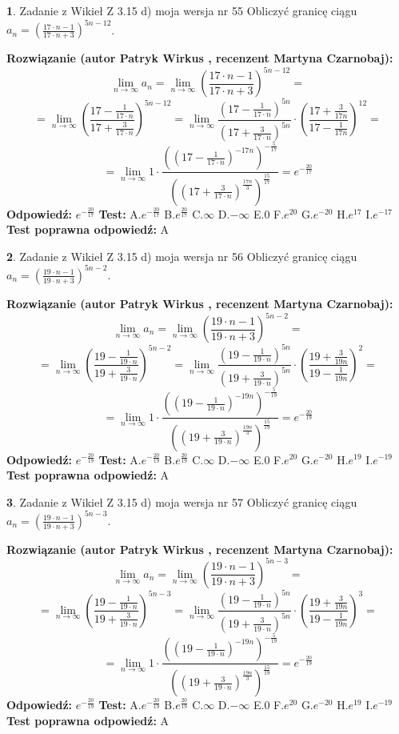 \documentclass[12pt, a4paper]{article}
\theoremstyle{definition} %
\newtheorem{zad}{}
\newcommand{\zadStart}[1]{\begin{zad}#1\newline}
\newcommand{\zadStop}{\end{zad}}
\newcommand{\rozwStart}[2]{\noindent \textbf{Rozwiązanie (autor #1 , recenzent #2): }\newline}
\newcommand{\rozwStop}{\newline}
\newcommand{\odpStart}{\noindent \textbf{Odpowiedź:}\newline}
\newcommand{\odpStop}{\newline}
\newcommand{\testStart}{\noindent \textbf{Test:}\newline}
\newcommand{\testStop}{\newline}
\newcommand{\kluczStart}{\noindent \textbf{Test poprawna odpowiedź:}\newline}
\newcommand{\kluczStop}{\newline}
\begin{document}
\zadStart{Zadanie z Wikieł Z 3.15 d) moja wersja nr 55}
Obliczyć granicę ciągu $a_{n}=(\frac{17\cdot n - 1}{17 \cdot n + 3})^{5n-12}$.
\zadStop
\rozwStart{Patryk Wirkus}{Martyna Czarnobaj}
$$\lim\limits_{n\to\infty} a_{n} = \lim\limits_{n\to\infty}(\frac{17\cdot n - 1}{17 \cdot n + 3})^{5n-12}=$$
$$=\lim\limits_{n\to\infty}(\frac{17 - \frac{1}{17\cdot n}}{17 + \frac{3}{17 \cdot n}})^{5n-12}=\lim\limits_{n\to\infty}\frac{(17 - \frac{1}{17\cdot n})^{5n}}{(17 + \frac{3}{17\cdot n})^{5n}} \cdot (\frac{17+\frac{3}{17n}}{17-\frac{1}{17n}})^{12}=$$
$$=\lim\limits_{n\to\infty} 1 \cdot \frac{((17-\frac{1}{17 \cdot n})^{-17n})^{-\frac{5}{17}}}{((17+\frac{3}{17 \cdot n})^{\frac{17n}{3}})^{\frac{15}{17}}} =e^{-\frac{20}{17}}$$
\rozwStop
\odpStart
$e^{-\frac{20}{17}}$
\odpStop
\testStart
A.$ e^{-\frac{20}{17}}$
B.$ e^{\frac{20}{17}}$
C.$\infty$
D.$-\infty$
E.$0$
F.$e^{20}$
G.$e^{-20}$
H.$e^{17}$
I.$e^{-17}$
\testStop
\kluczStart
A
\kluczStop



\zadStart{Zadanie z Wikieł Z 3.15 d) moja wersja nr 56}
Obliczyć granicę ciągu $a_{n}=(\frac{19\cdot n - 1}{19 \cdot n + 3})^{5n-2}$.
\zadStop
\rozwStart{Patryk Wirkus}{Martyna Czarnobaj}
$$\lim\limits_{n\to\infty} a_{n} = \lim\limits_{n\to\infty}(\frac{19\cdot n - 1}{19 \cdot n + 3})^{5n-2}=$$
$$=\lim\limits_{n\to\infty}(\frac{19 - \frac{1}{19\cdot n}}{19 + \frac{3}{19 \cdot n}})^{5n-2}=\lim\limits_{n\to\infty}\frac{(19 - \frac{1}{19\cdot n})^{5n}}{(19 + \frac{3}{19\cdot n})^{5n}} \cdot (\frac{19+\frac{3}{19n}}{19-\frac{1}{19n}})^{2}=$$
$$=\lim\limits_{n\to\infty} 1 \cdot \frac{((19-\frac{1}{19 \cdot n})^{-19n})^{-\frac{5}{19}}}{((19+\frac{3}{19 \cdot n})^{\frac{19n}{3}})^{\frac{15}{19}}} =e^{-\frac{20}{19}}$$
\rozwStop
\odpStart
$e^{-\frac{20}{19}}$
\odpStop
\testStart
A.$ e^{-\frac{20}{19}}$
B.$ e^{\frac{20}{19}}$
C.$\infty$
D.$-\infty$
E.$0$
F.$e^{20}$
G.$e^{-20}$
H.$e^{19}$
I.$e^{-19}$
\testStop
\kluczStart
A
\kluczStop



\zadStart{Zadanie z Wikieł Z 3.15 d) moja wersja nr 57}
Obliczyć granicę ciągu $a_{n}=(\frac{19\cdot n - 1}{19 \cdot n + 3})^{5n-3}$.
\zadStop
\rozwStart{Patryk Wirkus}{Martyna Czarnobaj}
$$\lim\limits_{n\to\infty} a_{n} = \lim\limits_{n\to\infty}(\frac{19\cdot n - 1}{19 \cdot n + 3})^{5n-3}=$$
$$=\lim\limits_{n\to\infty}(\frac{19 - \frac{1}{19\cdot n}}{19 + \frac{3}{19 \cdot n}})^{5n-3}=\lim\limits_{n\to\infty}\frac{(19 - \frac{1}{19\cdot n})^{5n}}{(19 + \frac{3}{19\cdot n})^{5n}} \cdot (\frac{19+\frac{3}{19n}}{19-\frac{1}{19n}})^{3}=$$
$$=\lim\limits_{n\to\infty} 1 \cdot \frac{((19-\frac{1}{19 \cdot n})^{-19n})^{-\frac{5}{19}}}{((19+\frac{3}{19 \cdot n})^{\frac{19n}{3}})^{\frac{15}{19}}} =e^{-\frac{20}{19}}$$
\rozwStop
\odpStart
$e^{-\frac{20}{19}}$
\odpStop
\testStart
A.$ e^{-\frac{20}{19}}$
B.$ e^{\frac{20}{19}}$
C.$\infty$
D.$-\infty$
E.$0$
F.$e^{20}$
G.$e^{-20}$
H.$e^{19}$
I.$e^{-19}$
\testStop
\kluczStart
A
\kluczStop
\end{document}
